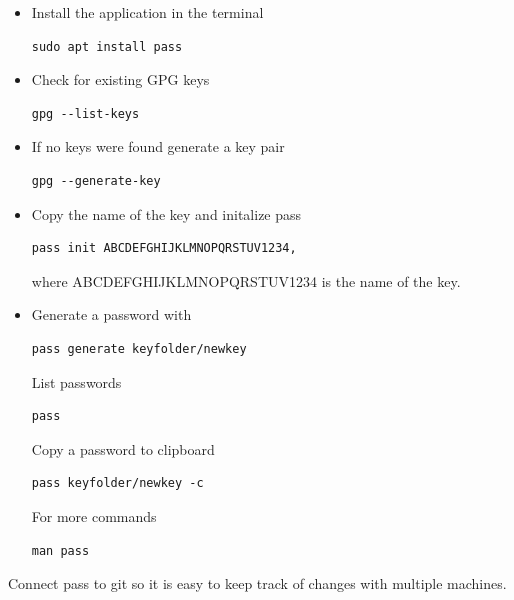 \documentclass{article}
\begin{document}
\begin{itemize}
\item Install the application in the terminal \\
\begin{verbatim}
sudo apt install pass  
\end{verbatim}
\item Check for existing GPG keys \\
\begin{verbatim}
gpg --list-keys 
\end{verbatim}
\item If no keys were found generate a key pair \\
\begin{verbatim}
gpg --generate-key
\end{verbatim}
\item Copy the name of the key and initalize pass\\
\begin{verbatim}
pass init ABCDEFGHIJKLMNOPQRSTUV1234, 
\end{verbatim}
where ABCDEFGHIJKLMNOPQRSTUV1234 is the name of the key.
\item Generate a password with \\
\begin{verbatim}
pass generate keyfolder/newkey 
\end{verbatim}
List passwords
\begin{verbatim}
pass
\end{verbatim}
Copy a password to clipboard \\
\begin{verbatim}
pass keyfolder/newkey -c
\end{verbatim}
For more commands
\begin{verbatim}
man pass
\end{verbatim}
\end{itemize}

Connect pass to git so it is easy to keep track of changes with multiple machines.
\end{document}
